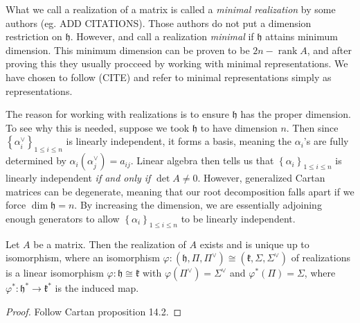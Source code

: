\documentclass[11pt, letterpaper]{article}
\theoremstyle{plain}
\begin{document}
What we call a realization of a matrix is called a \emph{minimal realization} by some authors (eg. ADD CITATIONS). Those authors do not put a dimension restriction on $\mathfrak{h} $. However, and call a realization \emph{minimal} if $\mathfrak{h} $ attains minimum dimension. This minimum dimension can be proven to be $2n - \operatorname{rank}A$, and after proving this they usually procceed by working with minimal representations. We have chosen to follow (CITE) and refer to minimal representations simply as representations.


\begin{remark}\label{rmk:3-3}
	The reason for working with realizations is to ensure $\mathfrak{h} $ has the proper dimension. To see why this is needed, suppose we took $\mathfrak{h} $ to have dimension $n$. Then since $\left\{ \alpha_i^\vee  \right\}_{1\leq i\leq n} $ is linearly independent, it forms a basis, meaning the $\alpha _i$'s are fully determined by $\alpha _i(\alpha _j^\vee )=a_{ij} $. Linear algebra then tells us that $\left\{ \alpha _i \right\}_{1\leq i\leq n} $ is linearly independent \emph{if and only if} $\det A \neq 0$. However, generalized Cartan matrices can be degenerate, meaning that our root decomposition falls apart if we force $\dim \mathfrak{h} =n$. By increasing the dimension, we are essentially adjoining enough generators to allow $\left\{ \alpha _i \right\}_{1\leq i\leq n} $ to be linearly independent.
\end{remark}

\begin{proposition}\label{prp:3-4}
	Let $A$ be a matrix. Then the realization of $A$ exists and is unique up to isomorphism, where an isomorphism $\varphi : (\mathfrak{h} ,\Pi ,\Pi ^\vee ) \cong (\mathfrak{k} , \Sigma ,\Sigma ^\vee )$ of realizations is a linear isomorphism $\varphi : \mathfrak{h} \cong \mathfrak{k} $ with $\varphi (\Pi^\vee )=\Sigma ^\vee $ and $\varphi^*(\Pi ) = \Sigma $, where $\varphi ^* : \mathfrak{h} ^* \to \mathfrak{k} ^*$ is the induced map.
\end{proposition}
\begin{proof}
	Follow Cartan proposition 14.2.
\end{proof}
\end{document}
